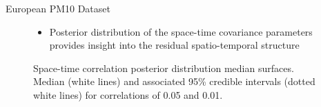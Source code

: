 \begin{frame}{European PM10 Dataset}
\begin{figure}[h!] 
\centerline{
\hfil
{} 
}
\caption{Space-time correlation posterior distribution median surfaces. Median (white lines) and associated 95\% credible intervals (dotted white lines) for correlations of 0.05 and 0.01.}\label{sptime-eff-rng}
\begin{itemize}
	\item Posterior distribution of the space-time covariance parameters provides insight into the residual spatio-temporal structure
\end{itemize}
\end{figure}
\end{frame}


